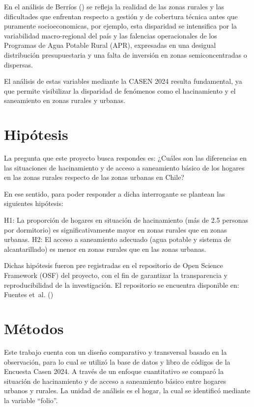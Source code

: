 \documentclass[
  spanish,
  a4paper,
  oneside]{scrbook}
\begin{document}
En el análisis de Berríos () se refleja
la realidad de las zonas rurales y las dificultades que enfrentan
respecto a gestión y de cobertura técnica antes que puramente
socioeconomicas, por ejemplo, esta disparidad se intensifica por la
variabilidad macro-regional del país y las falencias operacionales de
los Programas de Agua Potable Rural (APR), expresadas en una desigual
distribución presupuestaria y una falta de inversión en zonas
semiconcentradas o dispersas.

El análisis de estas variables mediante la CASEN 2024 resulta
fundamental, ya que permite visibilizar la disparidad de fenómenos como
el hacinamiento y el saneamiento en zonas rurales y urbanas.


\chapter{Hipótesis}\label{hipuxf3tesis}

La pregunta que este proyecto busca respondes es: ¿Cuáles son las
diferencias en las situaciones de hacinamiento y de acceso a saneamiento
básico de los hogares en las zonas rurales respecto de las zonas urbanas
en Chile?

En ese sentido, para poder responder a dicha interrogante se plantean
las siguientes hipótesis:

H1: La proporción de hogares en situación de hacinamiento (más de 2.5
personas por dormitorio) es significativamente mayor en zonas rurales
que en zonas urbanas. H2: El acceso a saneamiento adecuado (agua potable
y sistema de alcantarillado) es menor en zonas rurales que en las zonas
urbanas.

Dichas hipótesis fueron pre registradas en el repositorio de Open
Science Framework (OSF) del proyecto, con el fin de garantizar la
transparencia y reproducibilidad de la investigación. El repositorio se
encuentra disponible en: Fuentes et~al.
()


\chapter{Métodos}\label{muxe9todos}

Este trabajo cuenta con un diseño comparativo y transversal basado en la
observación, para lo cual se utilizó la base de datos y libro de códigos
de la Encuesta Casen 2024. A través de un enfoque cuantitativo se
comparó la situación de hacinamiento y de acceso a saneamiento básico
entre hogares urbanos y rurales. La unidad de análisis es el hogar, la
cual se identificó mediante la variable ``folio''.
\end{document}
